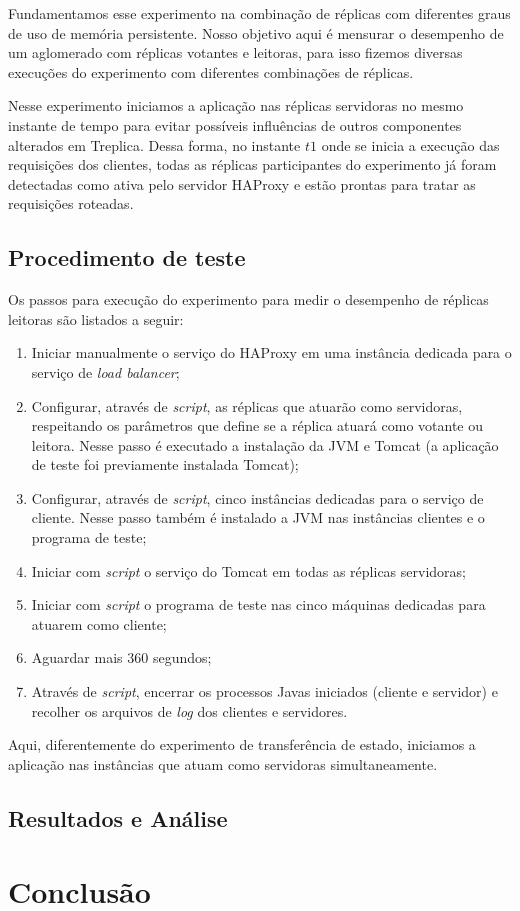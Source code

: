 Fundamentamos esse experimento na combinação de réplicas com diferentes graus de uso de
memória persistente. Nosso objetivo aqui é mensurar o desempenho de um aglomerado com
réplicas votantes e leitoras, para isso fizemos diversas execuções do experimento com
diferentes combinações de réplicas.

Nesse experimento iniciamos a aplicação nas réplicas servidoras no mesmo instante de tempo
para evitar possíveis influências de outros componentes alterados em Treplica. Dessa
forma, no instante $t1$ onde se inicia a execução das requisições dos clientes, todas as
réplicas participantes do experimento já foram detectadas como ativa pelo servidor HAProxy
e estão prontas para tratar as requisições roteadas.

\subsection{Procedimento de teste}

Os passos para execução do experimento para medir o desempenho de réplicas leitoras são
listados a seguir:

\begin{enumerate}
  \item Iniciar manualmente o serviço do HAProxy em uma instância dedicada para o serviço
    de \emph{load balancer};
  \item Configurar, através de \emph{script}, as réplicas que atuarão como servidoras,
    respeitando os parâmetros que define se a réplica atuará como votante ou leitora.
    Nesse passo é executado a instalação da JVM e Tomcat (a aplicação de teste foi
    previamente instalada Tomcat);
  \item Configurar, através de \emph{script}, cinco instâncias dedicadas para o serviço de
    cliente. Nesse passo também é instalado a JVM nas instâncias clientes e o programa de
    teste;
  \item Iniciar com \emph{script} o serviço do Tomcat em todas as réplicas servidoras;
  \item Iniciar com \emph{script} o programa de teste nas cinco máquinas dedicadas para
    atuarem como cliente;
  \item Aguardar mais 360 segundos;
  \item Através de \emph{script}, encerrar os processos Javas iniciados (cliente e
    servidor) e recolher os arquivos de \emph{log} dos clientes e servidores.
\end{enumerate}

Aqui, diferentemente do experimento de transferência de estado, iniciamos a aplicação nas
instâncias que atuam como servidoras simultaneamente.

\subsection{Resultados e Análise}


\section{Conclusão}\label{sec:conclusao}

